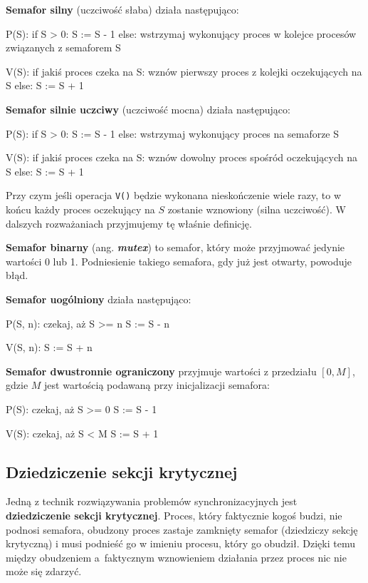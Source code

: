 \textbf{Semafor silny} (uczciwość słaba) działa następująco:
\begin{java}
P(S):
    if S > 0:
        S := S - 1
    else:
        wstrzymaj wykonujący proces w kolejce procesów związanych z semaforem S

V(S):
    if jakiś proces czeka na S:
        wznów pierwszy proces z kolejki oczekujących na S
    else:
        S := S + 1
\end{java}

\textbf{Semafor silnie uczciwy} (uczciwość mocna) działa następująco:
\begin{java}
P(S):
    if S > 0:
        S := S - 1
    else:
        wstrzymaj wykonujący proces na semaforze S

V(S):
    if jakiś proces czeka na S:
        wznów dowolny proces spośród oczekujących na S
    else:
        S := S + 1
\end{java}
Przy czym jeśli operacja \texttt{V()} będzie wykonana nieskończenie wiele razy, to w końcu każdy proces oczekujący na $S$ zostanie wznowiony (silna uczciwość). W dalszych rozważaniach przyjmujemy tę właśnie definicję.

\textbf{Semafor binarny} (ang. \textbf{\textit{mutex}}) to semafor, który może przyjmować jedynie wartości 0 lub 1. Podniesienie takiego semafora, gdy już jest otwarty, powoduje błąd.

\textbf{Semafor uogólniony} działa następująco:
\begin{java}
P(S, n):
    czekaj, aż S >= n
    S := S - n
    
V(S, n):
    S := S + n
\end{java}

\textbf{Semafor dwustronnie ograniczony} przyjmuje wartości z przedziału $[0, M]$, gdzie $M$ jest wartością podawaną przy inicjalizacji semafora:
\begin{java}
P(S):
    czekaj, aż S >= 0
    S := S - 1

V(S):
    czekaj, aż S < M
    S := S + 1
\end{java}

\subsection{Dziedziczenie sekcji krytycznej}

Jedną z technik rozwiązywania problemów synchronizacyjnych jest \textbf{dziedziczenie sekcji krytycznej}. Proces, który faktycznie kogoś budzi, nie podnosi semafora, obudzony proces zastaje zamknięty semafor (dziedziczy sekcję krytyczną) i musi podnieść go w imieniu procesu, który go obudził. Dzięki temu między obudzeniem a~faktycznym wznowieniem działania przez proces nic nie może się zdarzyć.

